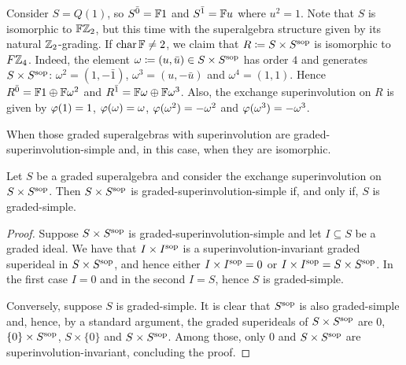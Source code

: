\begin{ex}\label{ex:FZ2xFZ2sop-iso-FZ4}
	Consider $S = Q(1)$, so $S^{\bar0} = \mathbb{F} 1$ and $S^{\bar1} = \mathbb{F} u$ where $u^2 =1$.
	Note that $S$ is isomorphic to $\mathbb{F}\mathbb{Z}_2$, but this time with the superalgebra structure given by its natural $\mathbb{Z}_2$-grading. 
	If $\operatorname{char} \mathbb{F} \neq 2$, we claim that $R \coloneqq S\times S^{\mathrm{sop}}$ is isomorphic to $F\mathbb{Z}_4$.
	Indeed, the element $\omega \coloneqq (u, \bar u) \in S\times S^{\mathrm{sop}}$ has order $4$ and generates $S\times S^{\mathrm{sop}}$: $\omega^2 = (1, - \bar 1)$, $\omega^3 = (u, - \bar u)$ and $\omega^4 = (1, 1)$.
	Hence $R^{\bar0} = \mathbb{F}1 \oplus \mathbb{F} \omega^2$ and $R^{\bar1} = \mathbb{F} \omega \oplus \mathbb{F} \omega^3$.
	Also, the exchange superinvolution on $R$ is given by $\varphi(1) = 1$, $\varphi(\omega) = \omega$, $\varphi(\omega^2) = -\omega^2$ and $\varphi(\omega^3) = -\omega^3$.
\end{ex}

When those graded superalgebras with superinvolution are graded-superinvolution-simple and, in this case, when they are isomorphic.

\begin{lemma}\label{lemma:SxSsop-simple}
	Let $S$ be a graded superalgebra and consider the exchange superinvolution on $S \times S^{\mathrm{sop}}$. 
	Then $S \times S^{\mathrm{sop}}$ is graded-superinvolution-simple if, and only if, $S$ is graded-simple. 
\end{lemma}

\begin{proof}
    Suppose $S \times S^{\mathrm{sop}}$ is graded-superinvolution-simple and let $I \subseteq S$ be a graded ideal. 
    We have that $I \times I^{\mathrm{sop}}$ is a superinvolution-invariant graded superideal in $S \times S^{\mathrm{sop}}$, and hence either $I \times I^{\mathrm{sop}} = 0$ or $I \times I^{\mathrm{sop}} = S \times S^{\mathrm{sop}}$. 
    In the first case $I = 0$ and in the second $I = S$, hence $S$ is graded-simple. 
    
    Conversely, suppose $S$ is graded-simple. 
    It is clear that $S^{\mathrm{sop}}$ is also graded-simple and, hence, by a standard argument, the graded superideals of $S \times S^{\mathrm{sop}}$ are $0$, $\{ 0 \} \times S^{\mathrm{sop}}$, $S \times \{ 0 \}$ and $S\times S^{\mathrm{sop}}$. 
    Among those, only $0$ and $S\times S^{\mathrm{sop}}$ are superinvolution-invariant, concluding the proof. 
\end{proof}

